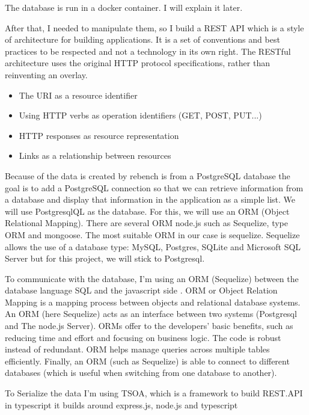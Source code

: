 \documentclass{article}
\begin{document}
The database is run in a docker container. I will explain it later.

After that, I needed to manipulate them, so I build a REST API which is a style of architecture for building applications. It is a set of conventions and best practices to be respected and not a technology in its own right. The RESTful architecture uses the original HTTP protocol specifications, rather than reinventing an overlay.

\begin{itemize}
    \item The URI as a resource identifier
    \item Using HTTP verbs as operation identifiers (GET, POST, PUT...)
    \item HTTP responses as resource representation
    \item Links as a relationship between resources
\end{itemize}

Because of the data is created by rebench is from a PostgreSQL database the goal is to add a PostgreSQL connection so that we can retrieve information from a database and display that information in the application as a simple list.
We will use PostgresqlQL as the database. For this, we will use an ORM (Object Relational Mapping). There are several ORM node.js such as Sequelize, type ORM and mongoose. The most suitable ORM in our case is sequelize. Sequelize allows the use of a database type: MySQL, Postgres, SQLite and Microsoft SQL Server but for this project, we will stick to Postgresql.

To communicate with the database, I'm using an ORM (Sequelize) between the database language SQL and the javascript side \cite{pereira2016working}. ORM or Object Relation Mapping is a mapping process between objects and relational database systems. An ORM (here Sequelize) acts as an interface between two systems (Postgresql and The node.js Server). ORMs offer to the developers' basic benefits, such as reducing time and effort and focusing on business logic. The code is robust instead of redundant. ORM helps manage queries across multiple tables efficiently. Finally, an ORM (such as Sequelize) is able to connect to different databases (which is useful when switching from one database to another).



To Serialize the data I'm using TSOA, which is a framework to build REST.API in typescript it builds around express.js, node.js and typescript
\end{document}
